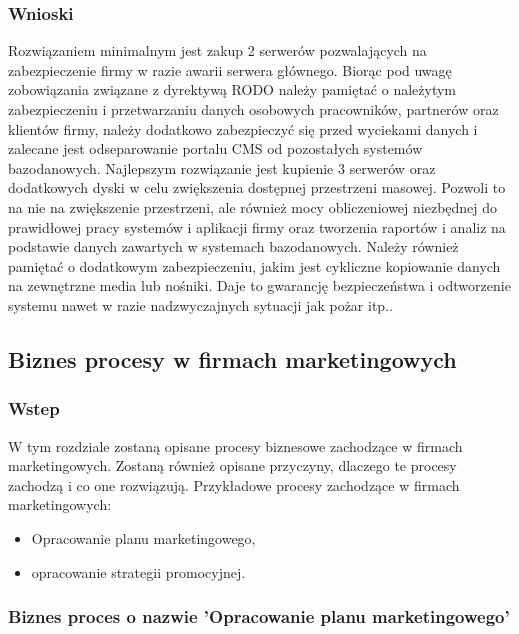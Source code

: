 \documentclass[a4paper, 12pt]{article}
\begin{document}
\subsubsection{Wnioski} 
	\hspace*{1cm} Rozwiązaniem minimalnym jest zakup 2 serwerów pozwalających na zabezpieczenie firmy w razie awarii serwera głównego. Biorąc pod uwagę zobowiązania związane z dyrektywą RODO należy pamiętać o należytym zabezpieczeniu i przetwarzaniu danych osobowych pracowników, partnerów oraz klientów firmy, należy dodatkowo zabezpieczyć się przed wyciekami danych i zalecane jest odseparowanie portalu CMS od pozostałych systemów bazodanowych. Najlepszym rozwiązanie jest kupienie 3 serwerów oraz dodatkowych dyski w celu zwiększenia dostępnej przestrzeni masowej. Pozwoli to na nie na zwiększenie przestrzeni, ale również mocy obliczeniowej niezbędnej do prawidłowej pracy systemów i aplikacji firmy oraz tworzenia raportów i analiz na podstawie danych zawartych w systemach bazodanowych. Należy również pamiętać o dodatkowym zabezpieczeniu, jakim jest cykliczne kopiowanie danych na zewnętrzne media lub nośniki. Daje to gwarancję bezpieczeństwa i odtworzenie systemu nawet w razie nadzwyczajnych sytuacji jak pożar itp..

\subsection{Biznes procesy w firmach marketingowych}
\subsubsection{Wstep}
\hspace*{1 cm} W tym rozdziale zostaną opisane procesy biznesowe zachodzące w firmach marketingowych. Zostaną również opisane przyczyny, dlaczego te procesy zachodzą i co one rozwiązują. Przykładowe procesy zachodzące w firmach marketingowych:
\begin{itemize}
	\item Opracowanie planu marketingowego,
	\item opracowanie strategii promocyjnej.
\end{itemize}
\subsubsection{Biznes proces o nazwie 'Opracowanie planu marketingowego'}
\end{document}
